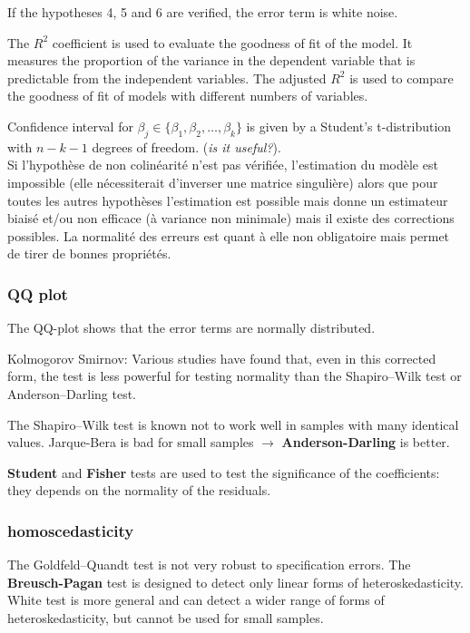 If the hypotheses 4, 5 and 6 are verified, the error term is white noise. 

The $R^2$ coefficient is used to evaluate the goodness of fit of the model. It measures the proportion of the variance in the dependent variable that is predictable from the independent variables. The adjusted $R^2$ is used to compare the goodness of fit of models with different numbers of variables.

Confidence interval for $\beta_j \in \{\beta_1, \beta_2, \ldots, \beta_k\}$ is given by a Student's t-distribution with $n - k - 1$ degrees of freedom. (\textit{is it useful?}). \\

Si l'hypothèse de non colinéarité n'est pas vérifiée, l'estimation du modèle est impossible (elle nécessiterait d'inverser une matrice singulière) alors que pour toutes les autres hypothèses l'estimation est possible mais donne un estimateur biaisé et/ou non efficace (à variance non minimale) mais il existe des corrections possibles. La normalité des erreurs est quant à elle non obligatoire mais permet de tirer de bonnes propriétés. 

\subsubsection{QQ plot}
The QQ-plot shows that the error terms are normally distributed.

Kolmogorov Smirnov: Various studies have found that, even in this corrected form, the test is less powerful for testing normality than the Shapiro–Wilk test or Anderson–Darling test.

The Shapiro–Wilk test is known not to work well in samples with many identical values. Jarque-Bera is bad for small samples $\rightarrow$ \textbf{Anderson-Darling} is better. 

\textbf{Student} and \textbf{Fisher} tests are used to test the significance of the coefficients: they depends on the normality of the residuals.

\subsubsection{homoscedasticity}
The Goldfeld–Quandt test is not very robust to specification errors. The \textbf{Breusch-Pagan} test is designed to detect only linear forms of heteroskedasticity. {White test} is more general and can detect a wider range of forms of heteroskedasticity, but cannot be used for small samples. \\


